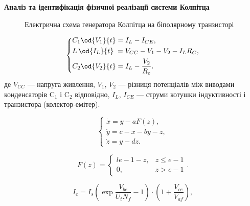 \documentclass[14pt,handout,utf8]{beamer}
\newcommand{\Xhead}[1]{
 \begin{center}%
      \textbf{#1}%
 \end{center}%
}
\begin{document}
\begin{frame}
  \frametitle{~}

  \Xhead{Аналіз та ідентифікація фізичної реалізації системи Колпітца}

  \begin{figure}[htb!]
    \begin{center}
      
    \end{center}
    \caption{Електрична схема генератора Колпітца на біполярному транзисторі}
    \label{atu:f:colp_schem}
  \end{figure}

  \begin{equation}
    \label{atu:eq:colp_phys}
    \begin{dcases}
      C_1 \od{V_{1}}{t}  = I_L - I_{CE} , \\
      L\, \od{I_L}{t} \; = V_{CC} - V_{1} - V_{2} - I_L R_C , \\
      C_2 \od{V_{2}}{t}  = I_L - \frac{V_{2}}{R_e}.
    \end{dcases}
  \end{equation}
  де
  $V_{CC} $ --- напруга живлення,
  $V_1 $, $ V_2 $ --- різниця потенціалів між виводами конденсаторів
  $\mathrm{C}_1 $ і
  $\mathrm{C}_2 $ відповідно,
  $I_L $,
  $I_{CE} $ --- струми котушки індуктивності і транзистора (колектор-емітер).

  \begin{equation}
    \label{atu:eq:colp}
    \begin{cases}
      \dot{x} = y - a F(z), \\
      \dot{y} = c - x - by - z, \\
      \dot{z} = y - d z.
    \end{cases}
  \end{equation}

  \[
    F(z) =
      \begin{cases}{l}
        e-1-z, & z \le e-1  \\
        0,     & z  >  e-1
      \end{cases}.
  \]

  \begin{equation}
    I_c
    = I_s \left( \exp\frac{V_{be}}{U_t N_f} - 1 \right)
    \cdot
    \left( 1 + \frac{V_{ce}}{V_{af}}\right),
    \label{atu:eq:bjt_model_sub}
  \end{equation}

\end{frame}
\end{document}
